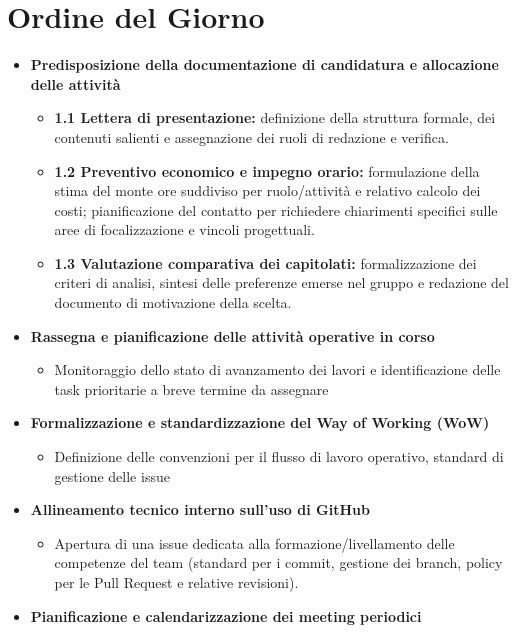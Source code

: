 \documentclass[11pt, a4paper]{article}
\begin{document}
\section{Ordine del Giorno}
\begin{itemize}
    \item \textbf{Predisposizione della documentazione di candidatura e allocazione delle attività}
        \begin{itemize}
            \item \textbf{1.1 Lettera di presentazione:} definizione della struttura formale, dei contenuti salienti e assegnazione dei ruoli di redazione e verifica.
            \item \textbf{1.2 Preventivo economico e impegno orario:} formulazione della stima del monte ore suddiviso per ruolo/attività e relativo calcolo dei costi; pianificazione del contatto per richiedere chiarimenti specifici sulle aree di focalizzazione e vincoli progettuali.
            \item \textbf{1.3 Valutazione comparativa dei capitolati:} formalizzazione dei criteri di analisi, sintesi delle preferenze emerse nel gruppo e redazione del documento di motivazione della scelta.
        \end{itemize}
    \item \textbf{Rassegna e pianificazione delle attività operative in corso}
        \begin{itemize}
            \item Monitoraggio dello stato di avanzamento dei lavori e identificazione delle task prioritarie a breve termine da assegnare
        \end{itemize}
    \item \textbf{Formalizzazione e standardizzazione del Way of Working (WoW)}
        \begin{itemize}
            \item Definizione delle convenzioni per il flusso di lavoro operativo, standard di gestione delle issue
        \end{itemize}
    \item \textbf{Allineamento tecnico interno sull'uso di GitHub}
        \begin{itemize}
            \item Apertura di una issue dedicata alla formazione/livellamento delle competenze del team (standard per i commit, gestione dei branch, policy per le Pull Request e relative revisioni).
        \end{itemize}
    \item \textbf{Pianificazione e calendarizzazione dei meeting periodici}

\end{itemize}
\end{document}
